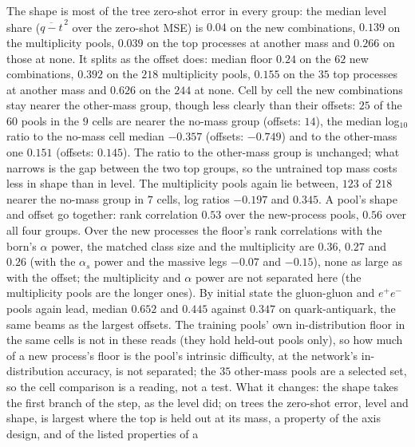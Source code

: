 \documentclass[11pt]{article}
\begin{document}
The shape is most of the tree zero-shot error in every group: the median level share ($\overline{q-t}^{\,2}$ over the
zero-shot MSE) is $0.04$ on the new combinations, $0.139$ on the multiplicity pools, $0.039$ on the top processes at
another mass and $0.266$ on those at none. It splits as the offset does: median floor $0.24$ on the $62$ new
combinations, $0.392$ on the $218$ multiplicity pools, $0.155$ on the $35$ top processes at another mass and $0.626$ on
the $244$ at none. Cell by cell the new combinations stay nearer the other-mass group, though less clearly than their
offsets: $25$ of the $60$ pools in the $9$ cells are nearer the no-mass group (offsets: $14$), the median log$_{10}$
ratio to the no-mass cell median $-0.357$ (offsets: $-0.749$) and to the other-mass one $0.151$ (offsets: $0.145$).
The ratio to the other-mass group is unchanged; what narrows is the gap between the two top groups, so the untrained
top mass costs less in shape than in level. The multiplicity pools again lie between, $123$ of $218$ nearer the no-mass
group in $7$ cells, log ratios $-0.197$ and $0.345$. A pool's shape and offset go together: rank correlation $0.53$
over the new-process pools, $0.56$ over all four groups. Over the new processes the floor's rank correlations with the
born's $\alpha$ power, the matched class size and the multiplicity are $0.36$, $0.27$ and $0.26$ (with the $\alpha_s$
power and the massive legs $-0.07$ and $-0.15$), none as large as with the offset; the multiplicity and $\alpha$ power
are not separated here (the multiplicity pools are the longer ones). By initial state the gluon-gluon and $e^+e^-$ pools
again lead, median $0.652$ and $0.445$ against $0.347$ on quark-antiquark, the same beams as the largest offsets. The
training pools' own in-distribution floor in the same cells is not in these reads (they hold held-out pools only), so
how much of a new process's floor is the pool's intrinsic difficulty, at the network's in-distribution accuracy, is not
separated; the $35$ other-mass pools are a selected set, so the cell comparison is a reading, not a test. What it
changes: the shape takes the first branch of the step, as the level did; on trees the zero-shot error, level and shape,
is largest where the top is held out at its mass, a property of the axis design, and of the listed properties of a
\end{document}
